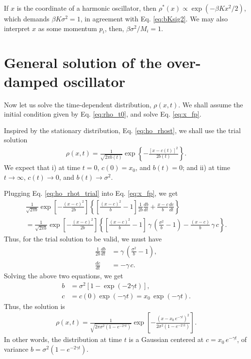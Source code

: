 \documentclass[11pt]{article}
\begin{document}
If $x$ is the coordinate of a harmonic oscillator,
then $\rho^*(x) \propto \exp( -\beta K x^2/2 )$,
which demands $\beta K \sigma^2 = 1$,
in agreement with Eq. \eqref{eq:bKsig2}.
%
We may also interpret $x$ as some momentum $p_i$,
%
then, $\beta \sigma^2 / M_i = 1$.



\section{General solution of the over-damped oscillator}



Now let us solve the time-dependent distribution, $\rho(x, t)$.
%
We shall assume the initial condition given by Eq. \eqref{eq:rho_t0},
%
and solve Eq. \eqref{eq:x_fp}.

Inspired by the stationary distribution, Eq. \eqref{eq:ho_rhost},
we shall use the trial solution
%
\begin{align}
\rho(x, t)
=
\frac{ 1 } { \sqrt{ 2 \pi b(t) } }
\exp \left\{
  -\frac{ [x - c(t)]^2 } { 2 b(t) }
\right\}.
\label{eq:ho_rhot_trial}
\end{align}
%
We expect that
i) at time $t = 0$,
$c(0) = x_0$, and $b(t) = 0$;
and
ii) at time $t \rightarrow \infty$,
$c(t) \rightarrow 0$, and $b(t) \rightarrow \sigma^2$.

Plugging Eq. \eqref{eq:ho_rhot_trial} into Eq. \eqref{eq:x_fp},
we get
\begin{multline}
  \frac{ 1 } { \sqrt{ 2 \pi b } }
  \exp \left[
    - \frac{ (x - c)^2 } { 2 b }
  \right]
  \left\{
    \left[
      \frac { (x - c)^2 } { b } - 1
    \right]
    \frac{ 1 } { 2 b }
    \frac{ d b } { d t }
    +
    \frac { x - c } { b }
    \frac { d c } { d t }
  \right\} \\
=
  \frac{ 1 } { \sqrt{ 2 \pi b } }
  \exp \left[
    - \frac{ (x - c)^2 } { 2 b }
  \right]
  \left\{
    \left[
      \frac{ (x - c)^2 } { b } - 1
    \right]
    \, \gamma \,
    \left(\frac{ \sigma^2 } b - 1\right)
    -
    \frac{ (x - c) } { b } \, \gamma \, c
  \right\}.
\end{multline}
%
Thus, for the trial solution to be valid,
we must have
\begin{align*}
\frac{ 1 } { 2 b }
\frac{ d b } { d t }
&=
\gamma \,
\left(\frac{ \sigma^2 } b - 1\right),
\\
\frac { d c } { d t }
&=
-\gamma \, c.
\end{align*}
Solving the above two equations, we get
\begin{align*}
b &= \sigma^2 [1 - \exp( - 2 \gamma t)],
\\
c &= c(0) \exp(-\gamma t) = x_0 \, \exp(-\gamma t).
\end{align*}
%
Thus, the solution is
%
\begin{align}
\rho(x, t)
=
\frac{ 1 } { \sqrt{ 2 \pi \sigma^2 (1 - e^{-2\gamma t}) } }
\exp \left[
  -\frac{ ( x - x_0 \, e^{-\gamma t} )^2 } { 2 \sigma^2 (1 - e^{-2\gamma t}) }
\right].
\label{eq:ho_rhot}
\end{align}
In other words,
the distribution at time $t$ is
a Gaussian centered at $c = x_0 \, e^{-\gamma t}$,
of variance $b = \sigma^2 (1 - e^{-2\gamma t})$.
\end{document}
